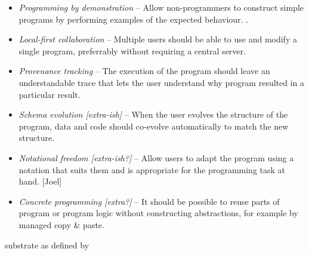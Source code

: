 \documentclass[sigconf,anonymous,screen]{acmart}
\begin{document}
\begin{itemize}
\item \emph{Programming by demonstration} --
  Allow non-programmers to construct simple programs by performing examples of the expected behaviour. \cite{leiva-2021-rapido}.
\item \emph{Local-first collaboration} --
  Multiple users should be able to use and modify a single program, preferrably without requiring a central server. \cite{kleppmann-2019-local}
\item \emph{Provenance tracking} --
  The execution of the program should leave an understandable trace that lets the user understand why program resulted in a particular result.
\item \emph{Schema evolution [extra-ish]} --
  When the user evolves the structure of the program, data and code should co-evolve automatically to match the new structure.
\item \emph{Notational freedom [extra-ish?]} --
  Allow users to adapt the program using a notation that suits them and is appropriate for the programming task at hand. [Joel]
\item \emph{Concrete programming [extra?]} --
  It should be possible to reuse parts of program or program logic without constructing abstractions, for example by managed copy \& paste.\cite{edwards-2006-copypaste,edwards-2022-copypaste}
\end{itemize}

substrate as defined by \cite{jakubovic-2022-ladder}

\cite{leiva-2021-rapido,cypher-1993-pbd}
\cite{chen-2023-miwa}

\cite{kleppmann-2019-local,klokmose-2024-mywebstrates}
\cite{ko-2004-whyline,ko-2009-whyline,krebs-2023-probelog}
\cite{ricciotti-2017-imperative,perera-2012-functional}
\cite{perera-2022-linked}







\end{document}
